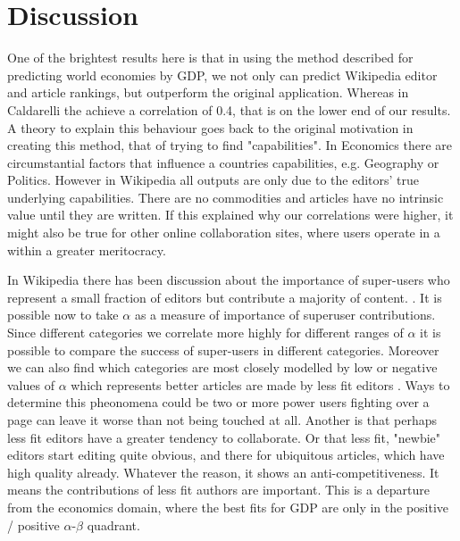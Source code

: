 \section{Discussion}

One of the brightest results here is that in using the method described for predicting world economies by GDP, we not only can predict Wikipedia editor and article rankings, but outperform the original application. Whereas in Caldarelli the achieve a correlation of 0.4, \cite{Caldarelli} that is on the lower end of our results. A theory to explain this behaviour goes back to the original motivation in creating this method, that of trying to find "capabilities". In Economics there are circumstantial factors that influence a countries capabilities, e.g. Geography or Politics. However in Wikipedia all outputs are only due to the editors' true underlying capabilities. There are no commodities and articles have no intrinsic value until they are written. If this explained why our correlations were higher, it might also be true for other online collaboration sites, where users operate in a within a greater meritocracy.

In Wikipedia there has been discussion about the importance of super-users who represent a small fraction of editors but contribute a majority of content. \cite{website:wikinewsreporter}. It is possible now to take $\alpha$ as a measure of importance of superuser contributions. Since different categories we correlate more highly for different ranges of $\alpha$ it is possible to compare the success of super-users in different categories. Moreover we can also find which categories are most closely modelled by low or negative values of $\alpha$ which represents better articles are made by less fit editors . Ways to determine this pheonomena could be two or more power users fighting over a page can leave it worse than not being touched at all. Another is that perhaps less fit editors have a greater tendency to collaborate. Or that less fit, "newbie" editors start editing quite obvious, and there for ubiquitous articles, which have high quality already.  Whatever the reason,  it shows an anti-competitiveness. It means the contributions of less fit authors are important. This is a departure from the economics domain, where the best fits for GDP are only in the positive / positive $\alpha$-$\beta$ quadrant. 
